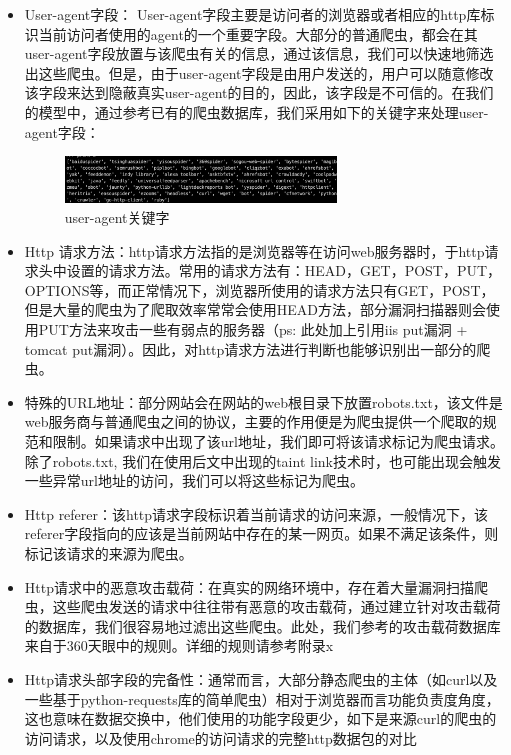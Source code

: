 \documentclass[doctor,privacy,twoside]{buaa_mac}
\begin{document}
\begin{itemize}
\item User-agent字段： User-agent字段主要是访问者的浏览器或者相应的http库标识当前访问者使用的agent的一个重要字段。大部分的普通爬虫，都会在其user-agent字段放置与该爬虫有关的信息，通过该信息，我们可以快速地筛选出这些爬虫。但是，由于user-agent字段是由用户发送的，用户可以随意修改该字段来达到隐蔽真实user-agent的目的，因此，该字段是不可信的。在我们的模型中，通过参考已有的爬虫数据库，我们采用如下的关键字来处理user-agent字段：
    
\centerline{}
\begin{figure}[!h]
  \centering
  \includegraphics[width=0.68\textwidth]{images/crawler_key_words.png}
  \caption{user-agent关键字}
  \label{fig:logo}
\end{figure}
\centerline{}
    
\item Http 请求方法：http请求方法指的是浏览器等在访问web服务器时，于http请求头中设置的请求方法。常用的请求方法有：HEAD，GET，POST，PUT，OPTIONS等，而正常情况下，浏览器所使用的请求方法只有GET，POST，但是大量的爬虫为了爬取效率常常会使用HEAD方法，部分漏洞扫描器则会使用PUT方法来攻击一些有弱点的服务器（ps: 此处加上引用iis put漏洞 + tomcat put漏洞）。因此，对http请求方法进行判断也能够识别出一部分的爬虫。

\item 特殊的URL地址：部分网站会在网站的web根目录下放置robots.txt，该文件是web服务商与普通爬虫之间的协议，主要的作用便是为爬虫提供一个爬取的规范和限制。如果请求中出现了该url地址，我们即可将该请求标记为爬虫请求。除了robots.txt, 我们在使用后文中出现的taint link技术时，也可能出现会触发一些异常url地址的访问，我们可以将这些标记为爬虫。

\item Http referer：该http请求字段标识着当前请求的访问来源，一般情况下，该referer字段指向的应该是当前网站中存在的某一网页。如果不满足该条件，则标记该请求的来源为爬虫。

\item Http请求中的恶意攻击载荷：在真实的网络环境中，存在着大量漏洞扫描爬虫，这些爬虫发送的请求中往往带有恶意的攻击载荷，通过建立针对攻击载荷的数据库，我们很容易地过滤出这些爬虫。此处，我们参考的攻击载荷数据库来自于360天眼中的规则。详细的规则请参考附录x

\item Http请求头部字段的完备性：通常而言，大部分静态爬虫的主体（如curl以及一些基于python-requests库的简单爬虫）相对于浏览器而言功能负责度角度，这也意味在数据交换中，他们使用的功能字段更少，如下是来源curl的爬虫的访问请求，以及使用chrome的访问请求的完整http数据包的对比
\end{itemize}
\end{document}
